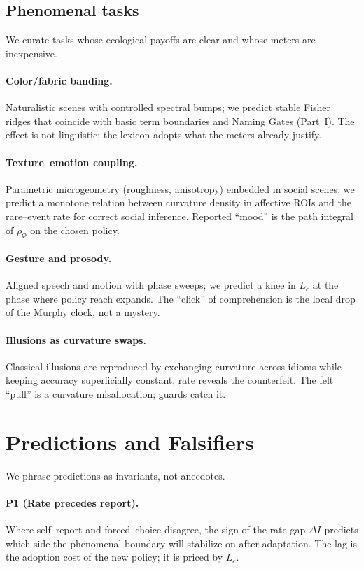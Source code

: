 \documentclass[11pt]{article}
\newcommand{\1}{\mathbf{1}}
\begin{document}
\subsection{Phenomenal tasks}
We curate tasks whose ecological payoffs are clear and whose meters are inexpensive.

\paragraph{Color/fabric banding.} Naturalistic scenes with controlled spectral bumps; we predict stable Fisher ridges that coincide with basic term boundaries and Naming Gates (Part~I). The effect is not linguistic; the lexicon adopts what the meters already justify.

\paragraph{Texture--emotion coupling.} Parametric microgeometry (roughness, anisotropy) embedded in social scenes; we predict a monotone relation between curvature density in affective ROIs and the rare--event rate for correct social inference. Reported ``mood'' is the path integral of $\rho_{\Phi}$ on the chosen policy.

\paragraph{Gesture and prosody.} Aligned speech and motion with phase sweeps; we predict a knee in $L_c$ at the phase where policy reach expands. The ``click'' of comprehension is the local drop of the Murphy clock, not a mystery.

\paragraph{Illusions as curvature swaps.} Classical illusions are reproduced by exchanging curvature across idioms while keeping accuracy superficially constant; rate reveals the counterfeit. The felt ``pull'' is a curvature misallocation; guards catch it.

\section{Predictions and Falsifiers}
\label{sec:predictions}

We phrase predictions as invariants, not anecdotes.

\paragraph{P1 (Rate precedes report).} Where self--report and forced--choice disagree, the sign of the rate gap $\Delta I$ predicts which side the phenomenal boundary will stabilize on after adaptation. The lag is the adoption cost of the new policy; it is priced by $L_c$.
\end{document}

